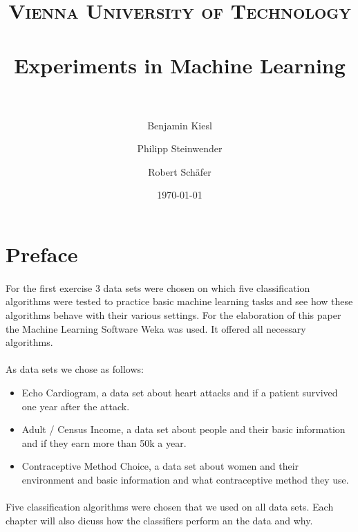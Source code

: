 \documentclass[paper=a4, fontsize=11pt]{scrartcl} %
\title{ 
\normalfont \normalsize 
\textsc{Vienna University of Technology} \\ [25pt] %
\horrule{0.5pt} \\[0.4cm] %
\huge Experiments in Machine Learning \\ %
\horrule{2pt} \\[0.5cm] %
}
\author{Benjamin Kiesl \and Philipp Steinwender \and Robert Sch\"{a}fer} %
\date{\normalsize\today} %
\numberwithin{equation}{section} %
\numberwithin{figure}{section} %
\numberwithin{table}{section} %
\begin{document}
\maketitle %


\tableofcontents

\section{Preface}

\paragraph{}For the first exercise 3 data sets were chosen on which five classification algorithms were tested to practice basic machine learning tasks and see how these algorithms behave with their various settings. For the elaboration of this paper the Machine Learning Software Weka was used. It offered all necessary algorithms.

\paragraph{}As data sets we chose as follows:

\begin{itemize}
\item Echo Cardiogram, a data set about heart attacks and if a patient survived one year after the attack.
\item Adult / Census Income, a data set about people and their basic information and if they earn more than 50k a year.
\item Contraceptive Method Choice, a data set about women and their environment and basic information and what contraceptive method they use.
\end{itemize}

\paragraph{}Five classification algorithms were chosen that we used on all data sets. Each chapter will also dicuss how the classifiers perform an the data and why.


\end{document}

